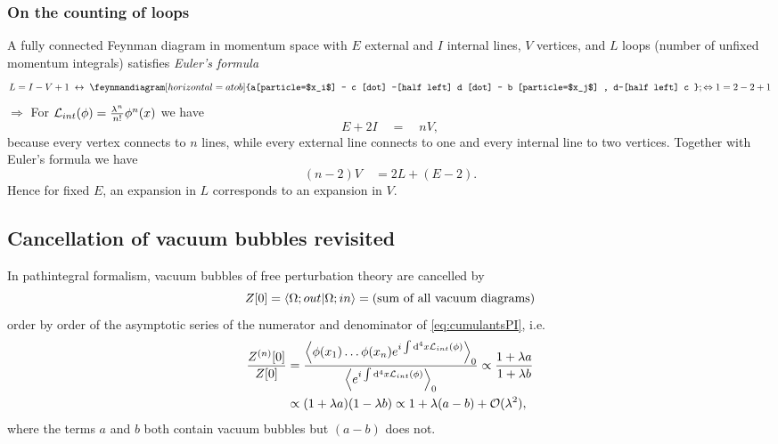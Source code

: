 \subsubsection{On the counting of loops}
A fully connected Feynman diagram in momentum space with $E$ external and $I$ internal lines, $V$ vertices, and $L$ loops (number of unfixed momentum integrals) satisfies \emph{Euler's formula}
\begin{equation}
	L = I-V+1 \; \leftrightarrow \; \feynmandiagram[horizontal=a to b] {a[particle=$x_i$] -- c [dot] --[half left] d [dot] -- b [particle=$x_j$] , d--[half left] c  };				\Leftrightarrow1= 2-2+1
\end{equation}
$\Rightarrow$ For $\mathcal{L}_{int}(\phi) = \frac{\lambda^n}{n!} \phi^n(x)$ we have
\begin{equation}
	E + 2 I \quad = \quad nV,
\end{equation}
because every vertex connects to $n$ lines, while every external line connects to one and every internal line to two vertices. Together with Euler's formula we have
\begin{equation}
	(n-2)V \quad = 2L + (E-2).
\end{equation}
Hence for fixed $E$, an expansion in $L$ corresponds to an expansion in $V$.

\subsection{Cancellation of vacuum bubbles revisited}
\begin{mybox}{}
	In pathintegral formalism, vacuum bubbles of free perturbation theory are cancelled by
	\begin{equation}
		Z[0] = \braket{\Omega;out}{\Omega;in} = (\text{sum of all vacuum diagrams})
			\end{equation}
			order by order of the asymptotic series of the numerator and denominator of \ref{eq:cumulantsPI}, i.e.
			\begin{align}
				\frac{Z^{(n)}[0]}{Z[0]} &= \frac{\expval{\phi(x_1) \dots \phi(x_n) e^{i \int \mathrm{d}^4 x \mathcal{L}_{int}(\phi)} }_0}{\expval{e^{i \int \mathrm{d}^4 x \mathcal{L}_{int}(\phi)} }_0} \propto \frac{1+\lambda a}{1+\lambda b}\nonumber \\
				&\propto (1+\lambda a) (1-\lambda b) \propto 1 + \lambda (a-b) + \mathcal{O}(\lambda^2),
			\end{align}
		where the terms $a$ and $b$ both contain vacuum bubbles but $(a-b)$ does not.
\end{mybox}



